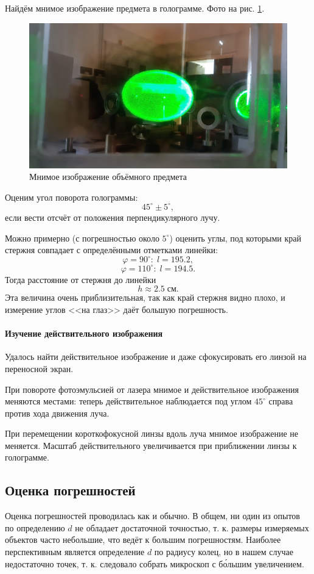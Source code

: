 \documentclass[a4paper]{article}
\begin{document}
Найдём мнимое изображение предмета в голограмме. Фото на рис. \ref{fig:ecwjolbkni}.
\begin{figure}[tbp]
	\centering
	\includegraphics[width=0.8\linewidth]{ecwjo_LBknI}
	\caption{Мнимое изображение объёмного предмета}
	\label{fig:ecwjolbkni}
\end{figure}
Оценим угол поворота голограммы:
\[45^\circ \pm 5^\circ, \]
если вести отсчёт от положения перпендикулярного лучу.

Можно примерно (с погрешностью около $ 5^\circ $) оценить углы, под которыми край стержня совпадает с определёнными отметками линейки:
\[ \varphi = 90^\circ:\; l = 195.2, \]
\[\varphi = 110^\circ:\; l = 194.5. \]
Тогда расстояние от стержня до линейки
\[ h \approx 2.5\; см. \]
Эта величина очень приблизительная, так как край стержня видно плохо, и измерение углов <<на глаз>> даёт большую погрешность.

\paragraph{Изучение действительного изображения}

Удалось найти действительное изображение и даже сфокусировать его линзой на переносной экран. 

При повороте фотоэмульсией от лазера мнимое и действительное изображения меняются местами: теперь действительное наблюдается под углом $ 45^\circ $ справа против хода движения луча.

При перемещении короткофокусной линзы вдоль луча мнимое изображение не меняется. Масштаб действительного увеличивается при приближении линзы к голограмме.

\subsection{Оценка погрешностей}

Оценка погрешностей проводилась как и обычно. В общем, ни один из опытов по определению $ d $ не  обладает достаточной точностью, т. к. размеры измеряемых объектов часто небольшие, что ведёт к большим погрешностям. Наиболее перспективным является определение $ d  $ по радиусу колец, но в нашем случае недостаточно точек, т. к. следовало собрать микроскоп с б\'{о}льшим  увеличением.
\end{document}
